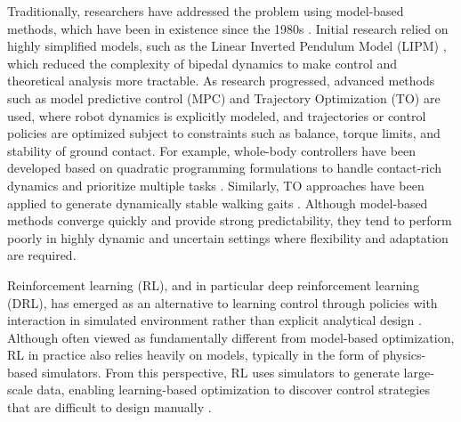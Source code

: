 Traditionally, researchers have addressed the problem using model-based methods, which have been in existence since the 1980s \citep{Gupta18062017,reher2020dynamicwalkingagileefficient}. Initial research relied on highly simplified models, such as the Linear Inverted Pendulum Model (LIPM) \citep{6697099}, which reduced the complexity of bipedal dynamics to make control and theoretical analysis more tractable. As research progressed, advanced methods such as model predictive control (MPC) \citep{machines10110975, li2022dynamicwalkingbipedalrobots, Herzog_2016} and Trajectory Optimization (TO) \citep{li2018usingdeepreinforcementlearning, 9206554} are used, where robot dynamics is explicitly modeled, and trajectories or control policies are optimized subject to constraints such as balance, torque limits, and stability of ground contact. For example, whole-body controllers have been developed based on quadratic programming formulations to handle contact-rich dynamics and prioritize multiple tasks \cite{1241826,article}. Similarly, TO approaches have been applied to generate dynamically stable walking gaits \cite{4115592, 7487270}. Although model-based methods converge quickly and provide strong predictability, they tend to perform poorly in highly dynamic and uncertain settings where flexibility and adaptation are required.

Reinforcement learning (RL), and in particular deep reinforcement learning (DRL), has emerged as an alternative to learning control through policies with interaction in simulated environment rather than explicit analytical design \citep{schulman2017trustregionpolicyoptimization, schulman2017proximalpolicyoptimizationalgorithms, lillicrap2019continuouscontroldeepreinforcement, heess2017emergencelocomotionbehavioursrich}. Although often viewed as fundamentally different from model-based optimization, RL in practice also relies heavily on models, typically in the form of physics-based simulators. From this perspective, RL uses simulators to generate large-scale data, enabling learning-based optimization to discover control strategies that are difficult to design manually \citep{pmlr-v28-levine13, williams2015modelpredictivepathintegral}.

